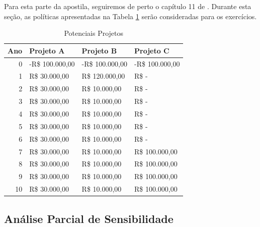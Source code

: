 \documentclass[12pt,letterpaper]{article}
\newcommand{\1}{\mathbbm{1}}
\numberwithin{equation}{section}
\begin{document}
Para esta parte da apostila, seguiremos de perto o capítulo 11 de \textcite{boardman_cost-benefit_2018}. Durante esta seção, as políticas apresentadas na Tabela \ref{tab:potenciaisprojetossensibilidade} serão consideradas para os exercícios.

\begin{table}[H]
  \centering
  \caption{Potenciais Projetos}
    \begin{tabular}{|l|l|l|l|}
    \toprule
    Ano   & Projeto A & Projeto B & Projeto C \\
    \midrule
    \multicolumn{1}{|r|}{0} & -R\$  100.000,00  & -R\$  100.000,00  & -R\$  100.000,00  \\
    \midrule
    \multicolumn{1}{|r|}{1} &  R\$    30.000,00  &  R\$  120.000,00  &  R\$                 -    \\
    \midrule
    \multicolumn{1}{|r|}{2} &  R\$    30.000,00  &  R\$    10.000,00  &  R\$                 -    \\
    \midrule
    \multicolumn{1}{|r|}{3} &  R\$    30.000,00  &  R\$    10.000,00  &  R\$                 -    \\
    \midrule
    \multicolumn{1}{|r|}{4} &  R\$    30.000,00  &  R\$    10.000,00  &  R\$                 -    \\
    \midrule
    \multicolumn{1}{|r|}{5} &  R\$    30.000,00  &  R\$    10.000,00  &  R\$                 -    \\
    \midrule
    \multicolumn{1}{|r|}{6} &  R\$    30.000,00  &  R\$    10.000,00  &  R\$                 -    \\
    \midrule
    \multicolumn{1}{|r|}{7} &  R\$    30.000,00  &  R\$    10.000,00  &  R\$  100.000,00  \\
    \midrule
    \multicolumn{1}{|r|}{8} &  R\$    30.000,00  &  R\$    10.000,00  &  R\$  100.000,00  \\
    \midrule
    \multicolumn{1}{|r|}{9} &  R\$    30.000,00  &  R\$    10.000,00  &  R\$  100.000,00  \\
    \midrule
    \multicolumn{1}{|r|}{10} &  R\$    30.000,00  &  R\$    10.000,00  &  R\$  100.000,00  \\
    \bottomrule
    \end{tabular}%
  \label{tab:potenciaisprojetossensibilidade}%
\end{table}%

\subsection{Análise Parcial de Sensibilidade}
\end{document}
